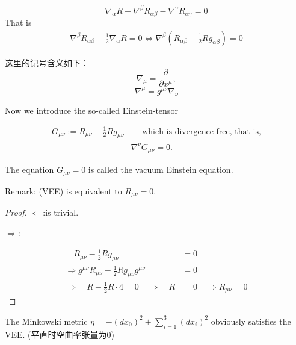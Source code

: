 \[
\nabla_\alpha R - \nabla^\beta R_{\alpha\beta} - \nabla^\gamma R_{\alpha\gamma} = 0
\]
That is
\begin{equation*}
    \begin{aligned}
    \nabla^\beta R_{\alpha\beta} - \frac{1}{2} \nabla_\alpha R = 0 \iff
        \nabla^\beta (R_{\alpha\beta} - \frac{1}{2} R g_{\alpha\beta}) = 0
    \end{aligned}
\end{equation*}






\begin{remark}
这里的记号含义如下：
   \[ \nabla_\mu = \frac{\partial}{\partial x^\mu},\]
\[\nabla^\mu = g^{\mu\nu} \nabla_\nu\]
\end{remark}

Now we introduce the so-called Einstein-tensor

\begin{equation*}
\begin{aligned}
    G_{\mu\nu}:=R_{\mu\nu}-\frac12 Rg_{\mu\nu}&\quad\text{ which is divergence-free, that is,}\\
    &\nabla^\nu G_{\mu\nu}=0.
\end{aligned}
\end{equation*}

The equation $G_{\mu\nu}=0$ is called the vacuum Einstein equation.


Remark: (VEE) is equivalent to $R_{\mu\nu}=0$.

\begin{proof}
$\Leftarrow$:\quad is trivial.

$\Rightarrow$: 

\begin{equation*}
    \begin{aligned}
        \quad R_{\mu\nu} - \frac{1}{2} R g_{\mu\nu} &= 0\\
\Rightarrow g^{\mu\nu}R_{\mu\nu} - \frac{1}{2} R g_{\mu\nu}g^{\mu\nu} &= 0\\
\Rightarrow \quad R - \frac{1}{2} R \cdot 4 = 0 \quad \Rightarrow \quad R &= 0\quad\Rightarrow R_{\mu\nu}=0
    \end{aligned}
\end{equation*}
  
\end{proof}

The Minkowski metric $\eta=-(dx_0)^2+\sum\limits_{i=1}^3(dx_i)^2$ obviously satisfies the VEE. (平直时空曲率张量为$0$)